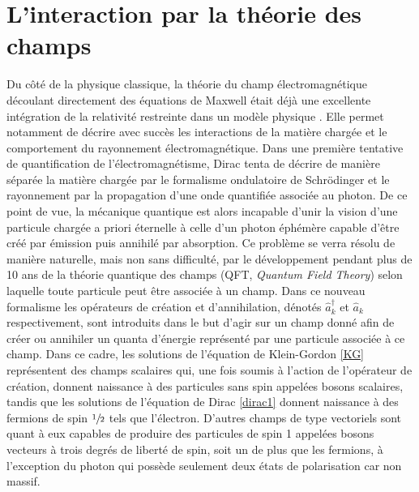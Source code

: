         \section{L'interaction par la théorie des champs}
        \label{sectionQFT}
        
        Du côté de la physique classique, la théorie du champ électromagnétique découlant directement des équations de Maxwell était déjà une excellente intégration de la relativité restreinte dans un modèle physique \cite{Maxwell}. Elle permet notamment de décrire avec succès les interactions de la matière chargée et le comportement du rayonnement électromagnétique. Dans une première tentative de quantification de l'électromagnétisme, Dirac tenta de décrire de manière séparée la matière chargée par le formalisme ondulatoire de Schrödinger et le rayonnement par la propagation d'une onde quantifiée associée au photon. De ce point de vue, la mécanique quantique est alors incapable d'unir la vision d'une particule chargée a priori éternelle à celle d'un photon éphémère capable d'être créé par émission puis annihilé par absorption. Ce problème se verra résolu de manière naturelle, mais non sans difficulté, par le développement pendant plus de 10 ans de la théorie quantique des champs (QFT, \textit{Quantum Field Theory}) selon laquelle toute particule peut être associée à un champ. Dans ce nouveau formalisme les opérateurs de création et d'annihilation, dénotés $\hat{a}^{\dag}_k$ et $\hat{a}_k$ respectivement, sont introduits dans le but d'agir sur un champ donné afin de créer ou annihiler un quanta d'énergie représenté par une particule associée à ce champ. Dans ce cadre, les solutions de l'équation de Klein-Gordon \ref{KG} représentent des champs scalaires qui, une fois soumis à l'action de l'opérateur de création, donnent naissance à des particules sans spin appelées bosons scalaires, tandis que les solutions de l'équation de Dirac \ref{dirac1} donnent naissance à des fermions de spin $\sfrac{1}{2}$ tels que l'électron. D'autres champs de type vectoriels sont quant à eux capables de produire des particules de spin 1 appelées bosons vecteurs à trois degrés de liberté de spin, soit un de plus que les fermions, à l'exception du photon qui possède seulement deux états de polarisation car non massif. \\
        
